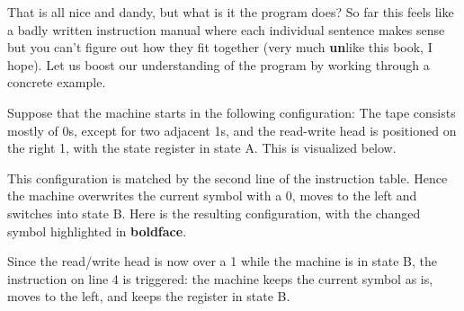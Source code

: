 \begin{examplebox}
    That is all nice and dandy, but what is it the program does?
    So far this feels like a badly written instruction manual where each individual sentence makes sense but you can't figure out how they fit together (very much \textbf{un}like this book, I hope).
    Let us boost our understanding of the program by working through a concrete example.

    Suppose that the machine starts in the following configuration: 
    The tape consists mostly of 0s, except for two adjacent 1s, and the read-write head is positioned on the right 1, with the state register in state A.
    This is visualized below.
    \begin{center}
    \end{center}
    This configuration is matched by the second line of the instruction table.
    Hence the machine overwrites the current symbol with a 0, moves to the left and switches into state B\@.
    Here is the resulting configuration, with the changed symbol highlighted in \textbf{boldface}.
    \begin{center}
    \end{center}
    Since the read/write head is now over a 1 while the machine is in state B, the instruction on line 4 is triggered: the machine keeps the current symbol as is, moves to the left, and keeps the register in state B\@.
    \begin{center}
\end{center}
\end{examplebox}
